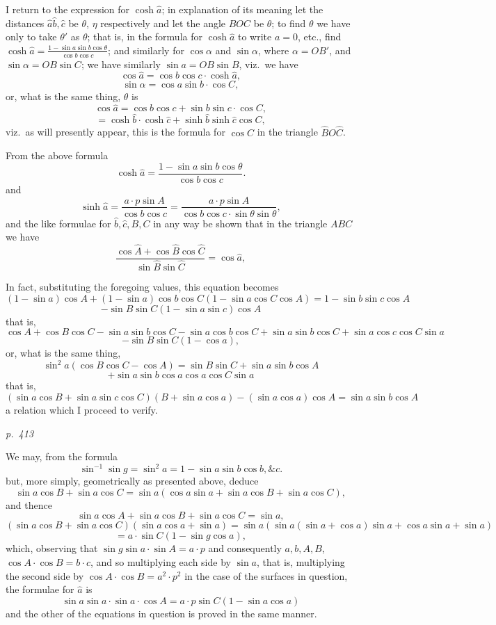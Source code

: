 \documentclass[11pt,a4paper]{article}
\theoremstyle{plain}
\theoremstyle{definition}
\begin{document}
\noindent
I return to the expression for $\cosh \hat{a}$; in explanation of its meaning let the
distances $\hat{a} \hat{b}, \hat{c}$ be $\theta$, $\eta$ respectively and let the angle $BOC$ be $\theta$; to find $\theta$ we
have only to take $\theta'$ as $\theta$; that is, in the formula for $\cosh \hat{a}$ to write $a = 0$, etc.,
find $\cosh \hat{a} = \frac{1 - \sin a \sin b \cos \theta}{\cos b \cos c}$; and similarly for $\cos \alpha$ and $\sin \alpha$, where
$\alpha = O B'$, and  $\sin \alpha = O B \sin C $; we have similarly $\sin a = O B \sin B$, viz.\ we have
\[
\cos \hat{a} = \cos b \cos c \cdot \cosh \hat{a},
\]
\[
\sin \alpha = \cos a \sin b \cdot \cos C,
\]
or, what is the same thing, $\theta$ is
\[
\cos \hat{a} = \cos b \cos c + \sin b \sin c \cdot \cos C,
\]
\[
= \cosh \hat{b} \cdot \cosh \hat{c} + \sinh \hat{b} \sinh \hat{c} \cos C,
\]
viz.\ as will presently appear, this is the formula for $\cos C$ in the triangle $\hat{B} O \hat{C}$.

From the above formula
\[
\cosh \hat{a} = \frac{1 - \sin a \sin b \cos \theta}{\cos b \cos c}.
\]
and
\[
\sinh \hat{a} = \frac{a \cdot p \sin A}{\cos b \cos c} = \frac{a \cdot p \sin A}{\cos b \cos c \cdot \sin \theta \sin \theta},
\]
and the like formulae for $\hat{b}, \hat{c}, B, C$ in any way be shown that in the triangle $ABC$ we have
\[
\frac{\cos \hat{A} + \cos \hat{B} \cos \hat{C}}{\sin \hat{B} \sin \hat{C}} = \cos \hat{a},
\]

In fact, substituting the foregoing values, this equation becomes
\[
(1 - \sin a) \cos A + (1 - \sin a) \cos b \cos C (1 - \sin a \cos C \cos A) = 1 - \sin b \sin c \cos A
\]
\[
- \sin B \sin C (1 - \sin a \sin c) \cos A
\]
that is,
\[
\cos A + \cos B \cos C - \sin a \sin b \cos C - \sin a \cos b \cos C + \sin a \sin b \cos C + \sin a \cos c \cos C \sin a
\]
\[
- \sin B \sin C (1 - \cos a),
\]
or, what is the same thing,
\[
\sin^2 a (\cos B \cos C - \cos A) = \sin B \sin C + \sin a \sin b \cos A
\]
\[
+ \sin a \sin b \cos a \cos a \cos C \sin a
\]
that is,
\[
(\sin a \cos B + \sin a \sin c \cos C) (B + \sin a \cos a) - (\sin a \cos a) \cos A = \sin a \sin b \cos A
\]
a relation which I proceed to verify.

\clearpage

\bigskip
\textit{p.~413}
\smallskip

\noindent
We may, from the formula
\[
\sin^{-1} \sin g = \sin^2 a = 1 - \sin a \sin b \cos b, \&c.
\]
but, more simply, geometrically as presented above, deduce
\[
\sin a \cos B + \sin a \cos C = \sin a (\cos a \sin a + \sin a \cos B + \sin a \cos C),
\]
and thence
\[
\sin a \cos A + \sin a \cos B + \sin a \cos C = \sin a,
\]
\[
(\sin a \cos B + \sin a \cos C)(\sin a \cos a + \sin a) = \sin a (\sin a (\sin a + \cos a) \sin a + \cos a \sin a + \sin a)
\]
\[
= a \cdot \sin C (1 - \sin g \cos a),
\]
which, observing that $\sin g \sin a \cdot \sin A = a \cdot p$ and consequently $a, b, A, B$,
$\cos A \cdot \cos B = b \cdot c$, and so multiplying each side by $\sin a$, that is, multiplying
the second side by $\cos A \cdot \cos B = a^2 \cdot p^2$ in the case of the surfaces in question, the formulae for $\hat{a}$ is
\[
\sin a \sin a \cdot \sin a \cdot \cos A = a \cdot p \sin C (1 - \sin a \cos a)
\]
and the other of the equations in question is proved in the same manner.
\end{document}
